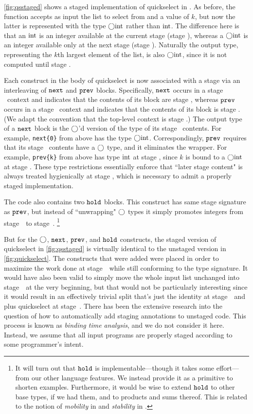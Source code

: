 \ref{fig:qsstaged} shows a staged implementation of quickselect in \lang.
As before, the function accepts as input the list to select from and a value of $k$,
but now the latter is represented with the type $\bigcirc{\rm int}$ rather than ${\rm int}$.
The difference here is that an ${\rm int}$ is an integer available at the current stage (stage \bbone), 
whereas a $\bigcirc{\rm int}$ is an integer available only at the next stage (stage \bbtwo).
Naturally the output type, representing the $k$th largest element of the list,
is also $\bigcirc{\rm int}$, since it is not computed until stage \bbtwo.

Each construct in the body of quickselect is now associated with a stage via an interleaving of ${\tt next}$ and ${\tt prev}$ blocks.  
Specifically, ${\tt next}$ occurs in a stage \bbone\ context and indicates that the contents of its block are stage \bbtwo, 
whereas ${\tt prev}$ occurs in a stage \bbtwo\ context and indicates that the contents of its block is stage \bbone.
(We adapt the convention that the top-level context is stage \bbone.)
The output type of a ${\tt next}$ block is the $\bigcirc$'d version of the type of its stage \bbtwo\ contents.  
For example, \verb|next{0}| from above has the type $\bigcirc{\rm int}$.
Correspondingly, ${\tt prev}$ requires that its stage \bbone\ contents have a $\bigcirc$ type, and it eliminates the wrapper.
For example, \verb|prev{k}| from above has type ${\rm int}$ at stage \bbtwo, since $k$ is bound to a $\bigcirc{\rm int}$ at stage \bbone.
These type restrictions essentially enforce that ``later stage content" is always treated hygienically at stage \bbone,
which is necessary to admit a properly staged implementation.

The code also contains two ${\tt hold}$ blocks.  
This construct has same stage signature as ${\tt prev}$,
but instead of ``unwrapping" $\bigcirc$ types it simply promotes integers from stage~\bbone\ to stage~\bbtwo.
\footnote{It will turn out that ${\tt hold}$ is implementable---though it takes some effort---from our other language features.
We instead provide it as a primitive to shorten examples.  
Furthermore, it would be wise to extend ${\tt hold}$ to other base types, if we had them, and to products and sums thereof.
This is related to the notion of {\em mobility} in \cite{murphy05} and {\em stability} in \cite{krishnaswami13}.}

But for the $\bigcirc$, ${\tt next}$, ${\tt prev}$, and ${\tt hold}$ constructs, 
the staged version of quickselect in \ref{fig:qsstaged} is virtually identical to the unstaged version in \ref{fig:quickselect}.
The constructs that were added were placed in order to maximize the work done at stage~\bbone\ while still conforming to the type signature.
It would have also been valid to simply move the whole input list unchanged into stage~\bbtwo\ at the very beginning, 
but that would not be particularly interesting since it would result in an effectively trivial split 
that's just the identity at stage~\bbone\ and plus quickselect at stage~\bbtwo.
There has been the extensive research into the question of how to automatically add staging annotations to unstaged code.
This process is known as {\em binding time analysis}, and we do not consider it here.
Instead, we assume that all input programs are properly staged according to some programmer's intent.

